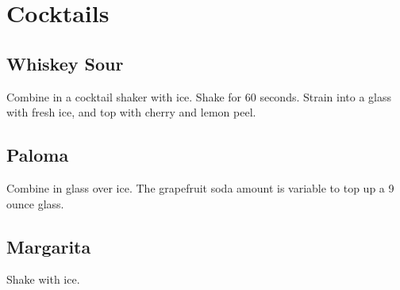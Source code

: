 \section{Cocktails}
\begin{recipe}

\subsection{Whiskey Sour}


Combine in a cocktail shaker with ice. Shake for 60 seconds. Strain into a glass 
with fresh ice, and top with cherry and lemon peel. 

\subsection{Paloma}


Combine in glass over ice. The grapefruit soda amount is variable to top up a 9 ounce glass. 

\subsection{Margarita}


Shake with ice. 

\end{recipe}
